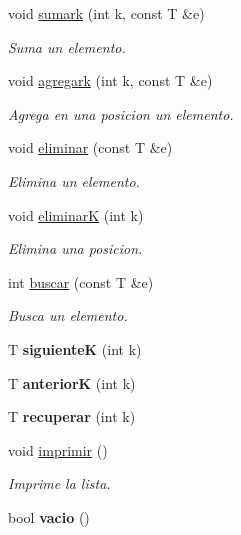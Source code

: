 \begin{DoxyCompactItemize}
void \hyperlink{class_lista_con_arreglo_abff25d43f812199b55bb34df9084c9ac}{sumark} (int k, const T \&e)
\begin{DoxyCompactList}\small\item\em Suma un elemento. \end{DoxyCompactList}\item 
void \hyperlink{class_lista_con_arreglo_a742afe90aa461d9dafbf9579c6615c81}{agregark} (int k, const T \&e)
\begin{DoxyCompactList}\small\item\em Agrega en una posicion un elemento. \end{DoxyCompactList}\item 
void \hyperlink{class_lista_con_arreglo_a0ee68c7b0f66324764bacd4ee4ffab50}{eliminar} (const T \&e)
\begin{DoxyCompactList}\small\item\em Elimina un elemento. \end{DoxyCompactList}\item 
void \hyperlink{class_lista_con_arreglo_acd8b8f484dc440dc64dc58cad375e7e4}{eliminarK} (int k)
\begin{DoxyCompactList}\small\item\em Elimina una posicion. \end{DoxyCompactList}\item 
int \hyperlink{class_lista_con_arreglo_a93187f91395bd4a498624470524a40aa}{buscar} (const T \&e)
\begin{DoxyCompactList}\small\item\em Busca un elemento. \end{DoxyCompactList}\item 
\hypertarget{class_lista_con_arreglo_ad491d37617d43b24c91021db0102fc88}{}\label{class_lista_con_arreglo_ad491d37617d43b24c91021db0102fc88} 
T {\bfseries siguienteK} (int k)
\item 
\hypertarget{class_lista_con_arreglo_ad32acb0a906dafff65201dbb506b48f7}{}\label{class_lista_con_arreglo_ad32acb0a906dafff65201dbb506b48f7} 
T {\bfseries anteriorK} (int k)
\item 
\hypertarget{class_lista_con_arreglo_af880c9a6795cf9281f2a217d0a4b0c07}{}\label{class_lista_con_arreglo_af880c9a6795cf9281f2a217d0a4b0c07} 
T {\bfseries recuperar} (int k)
\item 
\hypertarget{class_lista_con_arreglo_aa8267cef7510ef79626a812b3c85505d}{}\label{class_lista_con_arreglo_aa8267cef7510ef79626a812b3c85505d} 
void \hyperlink{class_lista_con_arreglo_aa8267cef7510ef79626a812b3c85505d}{imprimir} ()
\begin{DoxyCompactList}\small\item\em Imprime la lista. \end{DoxyCompactList}\item 
\hypertarget{class_lista_con_arreglo_ad66ab536ce3bdf4df20ee7e89cd148ee}{}\label{class_lista_con_arreglo_ad66ab536ce3bdf4df20ee7e89cd148ee} 
bool {\bfseries vacio} ()
\end{DoxyCompactItemize}
